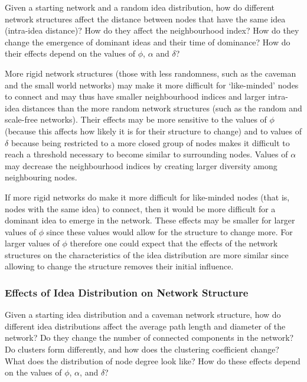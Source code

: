 Given a starting network and a random idea distribution, how do different network structures affect the distance between nodes that have the same idea (intra-idea distance)? How do they affect the neighbourhood index? How do they change the emergence of dominant ideas and their time of dominance? How do their effects depend on the values of $\phi$, $\alpha$ and $\delta$?


More rigid network structures (those with less randomness, such as the caveman and the small world networks) may make it more difficult for `like-minded' nodes to connect and may thus have smaller neighbourhood indices and larger intra-idea distances than the more random network structures (such as the random and scale-free networks). Their effects may be more sensitive to the values of $\phi$ (because this affects how likely it is for their structure to change) and to values of $\delta$ because being restricted to a more closed group of nodes makes it difficult to reach a threshold necessary to become similar to surrounding nodes. Values of $\alpha$ may decrease the neighbourhood indices by creating larger diversity among neighbouring nodes.

If more rigid networks do make it more difficult for like-minded nodes (that is, nodes with the same idea) to connect, then it would be more difficult for a dominant idea to emerge in the network. These effects may be smaller for larger values of $\phi$ since these values would allow for the structure to change more. For larger values of $\phi$ therefore one could expect that the effects of the network structures on the characteristics of the idea distribution are more similar since allowing to change the structure removes their initial influence.


\subsubsection{Effects of Idea Distribution on Network Structure}

Given a starting idea distribution and a caveman network structure, how do different idea distributions affect the average path length and diameter of the network? Do they change the number of connected components in the network? Do clusters form differently, and how does the clustering coefficient change? What does the distribution of node degree look like? How do these effects depend on the values of $\phi$, $\alpha$, and $\delta$?


